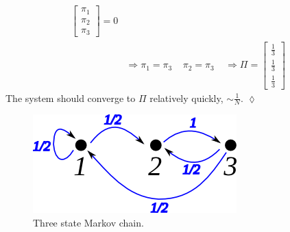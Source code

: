 \begin{example}
\begin{align*}
\left[\begin{array}{c} \pi_1 \\ \pi_2 \\ \pi_3 \end{array}\right] = 0 \\
&\Rightarrow \pi_1=\pi_3 ~~~~~ \pi_2=\pi_3 ~~~~~ \Rightarrow \Pi=\left[\begin{array}{c} \frac{1}{3} \\ \frac{1}{3} \\ \frac{1}{3} \end{array}\right]
\end{align*}
The system should converge to $\Pi$ relatively quickly, $\sim\frac{1}{N}$.
$\lozenge$
\end{example}

\begin{figure}[ht!]
	\centering
	\includegraphics[width=.4\textwidth]{images/10mc3b}
	\caption{Three state Markov chain.}
	\label{fig:10mc3b}
\end{figure}

